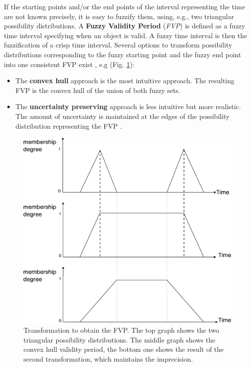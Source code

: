 If the starting points and/or the end points of the interval representing the time are not known precisely, it is easy to fuzzify them, using, e.g., two triangular possibility distributions.
A \textbf{Fuzzy Validity Period} (\emph{FVP}) is defined as a fuzzy time interval specifying when an object is valid. A fuzzy time interval is then the fuzzification of a crisp time interval. Several options to transform possibility distributions corresponding to the fuzzy starting point and the fuzzy end point into one consistent FVP exist \cite{Garrido2009}, e.g (Fig. \ref{fig:fuzzy-validity-period}):
\begin{itemize}
\item The \textbf{convex hull} approach is the most intuitive approach. The resulting FVP is the convex hull of the union of both fuzzy sets.
\item The \textbf{uncertainty preserving} approach is less intuitive but more realistic. The amount of uncertainty is maintained at the edges of the possibility distribution representing the FVP \cite{Garrido2009}.
\end{itemize}

\begin{figure}[h!]
  \centering
  \includegraphics[scale=0.3]{graphs/trapezoidalDistribution.eps}
  \caption{Transformation to obtain the FVP. The top graph shows the two triangular possibility distributions. The middle graph shows the convex hull validity period, the bottom one shows the result of the second transformation, which maintains the imprecision.}
  \label{fig:fuzzy-validity-period}
\end{figure}

